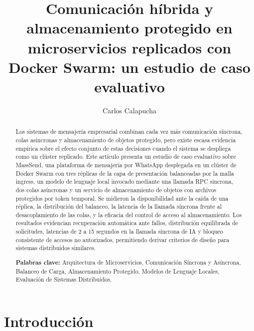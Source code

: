 \title{\textbf{Comunicación híbrida y almacenamiento protegido en microservicios
replicados con Docker Swarm: un estudio de caso evaluativo}}

\author[1]{Carlos Calapucha }
%

\date{}



\maketitle

\begin{abstract}
\noindent
Los sistemas de mensajería empresarial combinan cada vez más comunicación
síncrona, colas asíncronas y almacenamiento de objetos protegido, pero existe
escasa evidencia empírica sobre el efecto conjunto de estas decisiones cuando
el sistema se despliega como un clúster replicado. Este artículo presenta un
estudio de caso evaluativo sobre MassSend, una plataforma de mensajería por
WhatsApp desplegada en un clúster de Docker Swarm con tres réplicas de la capa
de presentación balanceadas por la malla ingress, un modelo de lenguaje local
invocado mediante una llamada RPC síncrona, dos colas asíncronas y un servicio
de almacenamiento de objetos con archivos protegidos por token temporal. Se
midieron la disponibilidad ante la caída de una réplica, la distribución del
balanceo, la latencia de la llamada síncrona frente al desacoplamiento de las
colas, y la eficacia del control de acceso al almacenamiento. Los resultados
evidencian recuperación automática ante fallos, distribución equilibrada de
solicitudes, latencias de 2 a 15 segundos en la llamada síncrona de IA y
bloqueo consistente de accesos no autorizados, permitiendo derivar criterios
de diseño para sistemas distribuidos similares.

\vspace{0.3cm}
\noindent\textbf{Palabras clave:} Arquitectura de Microservicios, Comunicación
Síncrona y Asíncrona, Balanceo de Carga, Almacenamiento Protegido, Modelos de
Lenguaje Locales, Evaluación de Sistemas Distribuidos.
\end{abstract}

\section{Introducción}

